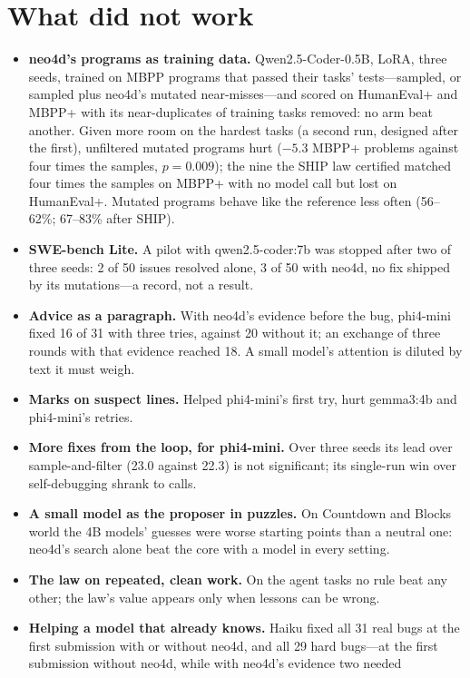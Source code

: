 \documentclass[10pt]{article}
\begin{document}
\section{What did not work}
\label{sec:negative}
\begin{itemize}
  \item \textbf{neo4d's programs as training data.} Qwen2.5-Coder-0.5B, LoRA, three seeds, trained on MBPP programs
  that passed their tasks' tests---sampled, or sampled plus neo4d's mutated near-misses---and scored on HumanEval+ and
  MBPP+ with its near-duplicates of training tasks removed: no arm beat another. Given more room on the hardest tasks
  (a second run, designed after the first), unfiltered mutated programs hurt ($-5.3$ MBPP+ problems against four times
  the samples, $p=0.009$); the nine the SHIP law certified matched four times the samples on MBPP+ with no model call
  but lost on HumanEval+. Mutated programs behave like the reference less often (56--62\%; 67--83\% after SHIP).
  \item \textbf{SWE-bench Lite.} A pilot with qwen2.5-coder:7b was stopped after two of three seeds: 2 of 50 issues
  resolved alone, 3 of 50 with neo4d, no fix shipped by its mutations---a record, not a result.
  \item \textbf{Advice as a paragraph.} With neo4d's evidence before the bug, phi4-mini fixed 16 of 31 with three
  tries, against 20 without it; an exchange of three rounds with that evidence reached 18. A small model's attention
  is diluted by text it must weigh.
  \item \textbf{Marks on suspect lines.} Helped phi4-mini's first try, hurt gemma3:4b and phi4-mini's retries.
  \item \textbf{More fixes from the loop, for phi4-mini.} Over three seeds its lead over sample-and-filter (23.0
  against 22.3) is not significant; its single-run win over self-debugging shrank to calls.
  \item \textbf{A small model as the proposer in puzzles.} On Countdown and Blocks world the 4B models' guesses were
  worse starting points than a neutral one: neo4d's search alone beat the core with a model in every setting.
  \item \textbf{The law on repeated, clean work.} On the agent tasks no rule beat any other; the law's value appears
  only when lessons can be wrong.
  \item \textbf{Helping a model that already knows.} Haiku fixed all 31 real bugs at the first submission with or
  without neo4d, and all 29 hard bugs---at the first submission without neo4d, while with neo4d's evidence two needed

\end{itemize}
\end{document}
